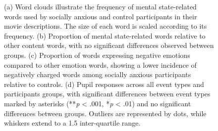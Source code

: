 \begin{figure}[!ht]
	\centering
	\caption{(a) Word clouds illustrate the frequency of mental state-related words used by socially anxious and control participants in their movie descriptions. The size of each word is scaled according to its frequency. (b) Proportion of mental state-related words relative to other content words, with no significant differences observed between groups. (c) Proportion of words expressing negative emotions compared to other emotion words, showing a lower incidence of negatively charged words among socially anxious participants relative to controls. (d) Pupil responses across all event types and participants groups, with significant differences between event types marked by asterisks (**\textit{p} < .001, *\textit{p} < .01) and no significant differences between groups. Outliers are represented by dots, while whiskers extend to a 1.5 inter-quartile range.}
    \vspace*{-10pt}
	\label{fig:beh-pupil-sa}
\end{figure}

